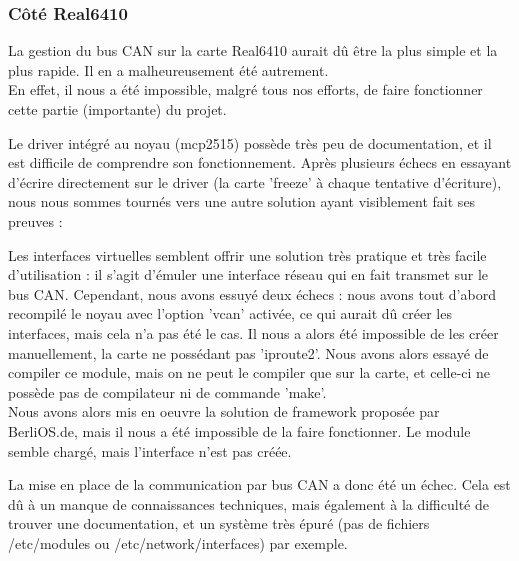 \documentclass[a4,french,12pt]{article}
\begin{document}
\subsubsection{Côté Real6410}
La gestion du bus CAN sur la carte Real6410 aurait dû être la plus simple et la plus rapide. Il en a malheureusement été autrement.\\
En effet, il nous a été impossible, malgré tous nos efforts, de faire fonctionner cette partie (importante) du projet.

Le driver intégré au noyau (mcp2515) possède très peu de documentation, et il est difficile de comprendre son fonctionnement. Après plusieurs échecs en essayant d'écrire directement sur le driver (la carte 'freeze' à chaque tentative d'écriture), nous nous sommes tournés vers une autre solution ayant visiblement fait ses preuves :

Les interfaces virtuelles semblent offrir une solution très pratique et très facile d'utilisation : il s'agit d'émuler une interface réseau qui en fait transmet sur le bus CAN. Cependant, nous avons essuyé deux échecs : nous avons tout d'abord recompilé le noyau avec l'option 'vcan' activée, ce qui aurait dû créer les interfaces, mais cela n'a pas été le cas. Il nous a alors été impossible de les créer manuellement, la carte ne possédant pas 'iproute2'. Nous avons alors essayé de compiler ce module, mais on ne peut le compiler que sur la carte, et celle-ci ne possède pas de compilateur ni de commande 'make'. \\
Nous avons alors mis en oeuvre la solution de framework proposée par BerliOS.de, mais il nous a été impossible de la faire fonctionner. Le module semble chargé, mais l'interface n'est pas créée.

La mise en place de la communication par bus CAN a donc été un échec. Cela est dû à un manque de connaissances techniques, mais également à la difficulté de trouver une documentation, et un système très épuré (pas de fichiers /etc/modules ou /etc/network/interfaces) par exemple.
\end{document}
